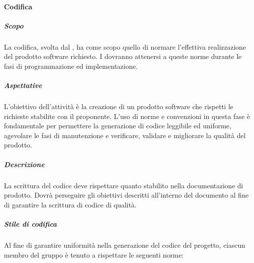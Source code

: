 			\paragraph{Codifica}	
				\subparagraph{Scopo}
				La codifica, svolta dal , ha come scopo quello di normare l'effettiva realizzazione del prodotto software richiesto. I  dovranno attenersi a queste norme durante le fasi di programmazione ed implementazione.
				\subparagraph{Aspettative}
				L'obiettivo dell'attività è la creazione di un prodotto software che rispetti le richieste stabilite con il proponente. L'uso di norme e convenzioni in questa fase è fondamentale per permettere la generazione di codice leggibile ed uniforme, agevolare le fasi di manutenzione e verificare, validare e migliorare la qualità del prodotto.
				\subparagraph{Descrizione}
				La scrittura del codice deve rispettare quanto stabilito nella documentazione di prodotto. Dovrà perseguire gli obiettivi descritti all'interno del documento  al fine di garantire la scrittura di codice di qualità.
				\subparagraph{Stile di codifica}
				Al fine di garantire uniformità nella generazione del codice del progetto, ciascun membro del gruppo è tenuto a rispettare le seguenti norme:
